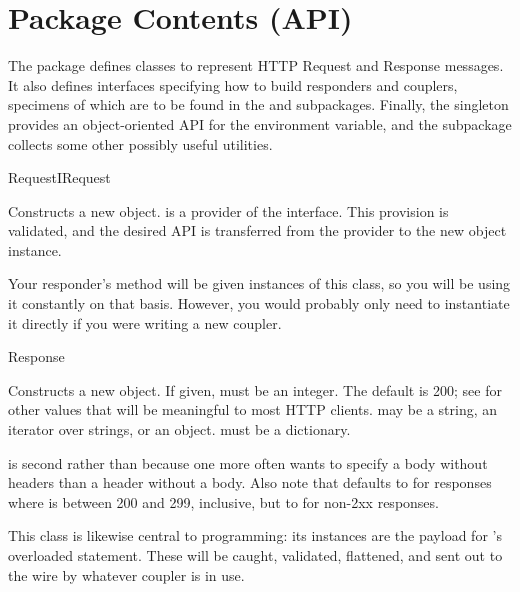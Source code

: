 \chapter{Package Contents (API) \label{api}}

The  package defines classes to represent HTTP Request and
Response messages. It also defines interfaces specifying how to build responders
and couplers, specimens of which are to be found in the  and
 subpackages. Finally, the  singleton provides an
object-oriented API for the  environment variable, and the
 subpackage collects some other possibly useful utilities.



\begin{classdesc}{Request}{IRequest}

Constructs a new  object.  is a provider of the
 interface. This provision is validated, and the desired API is
transferred from the  provider to the new object instance.

Your responder's  method will be given instances of this class,
so you will be using it constantly on that basis. However, you would probably
only need to instantiate it directly if you were writing a new coupler.

\end{classdesc}



\begin{classdesc}{Response}{  }

Constructs a new  object. If given,  must be an
integer. The default is 200; see
 for other values that will be meaningful to most HTTP clients. 
may be a string, an iterator over strings, or an 
object.  must be a dictionary.

 is second rather than  because one more often wants to
specify a body without headers than a header without a body. Also note that
 defaults to  for responses where
 is between 200 and 299, inclusive, but to  for
non-2xx responses.

This class is likewise central to  programming: its instances are
the payload for 's overloaded  statement. These will
be caught, validated, flattened, and sent out to the wire by whatever coupler is
in use.

\end{classdesc}








